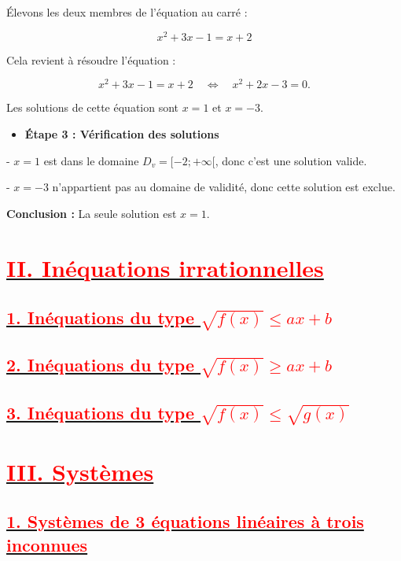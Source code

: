 \documentclass[12pt]{article}
\newcounter{solution}
\begin{document}
Élevons les deux membres de l'équation au carré :

\[
x^{2} + 3x - 1 = x + 2
\]

Cela revient à résoudre l'équation :

\[
x^{2} + 3x - 1 = x + 2 \quad \Leftrightarrow \quad x^{2} + 2x - 3 = 0.
\]

Les solutions de cette équation sont \( x = 1 \) et \( x = -3 \).

\begin{itemize}
    \item \textbf{Étape 3 : Vérification des solutions}
\end{itemize}

- \( x = 1 \) est dans le domaine \( D_v = [-2; +\infty[ \), donc c'est une solution valide.

- \( x = -3 \) n'appartient pas au domaine de validité, donc cette solution est exclue.

\textbf{Conclusion :} La seule solution est \( x = 1 \).

\section*{\underline{\textbf{\textcolor{red}{II. Inéquations irrationnelles}}}}
\subsection*{\underline{\textbf{\textcolor{red}{1. Inéquations du type \( \sqrt{f(x)} \leq ax+b \) }}}}
\subsection*{\underline{\textbf{\textcolor{red}{2. Inéquations du type \( \sqrt{f(x)} \geq ax+b \) }}}}
\subsection*{\underline{\textbf{\textcolor{red}{3. Inéquations du type \( \sqrt{f(x)} \leq  \sqrt{g(x)} \) }}}}

\section*{\underline{\textbf{\textcolor{red}{III. Systèmes}}}}
\subsection*{\underline{\textbf{\textcolor{red}{1. Systèmes de 3 équations linéaires à trois inconnues}}}}
\end{document}
